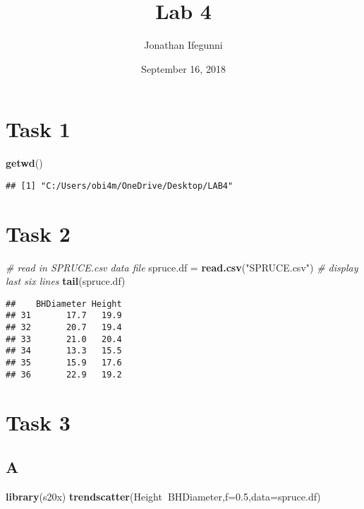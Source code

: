 \documentclass[]{article}
\title{Lab 4}
\author{Jonathan Ifegunni}
\date{September 16, 2018}
\newenvironment{Shaded}{\begin{snugshade}}{\end{snugshade}}
\newcommand{\KeywordTok}[1]{\textcolor[rgb]{0.13,0.29,0.53}{\textbf{#1}}}
\newcommand{\DataTypeTok}[1]{\textcolor[rgb]{0.13,0.29,0.53}{#1}}
\newcommand{\FloatTok}[1]{\textcolor[rgb]{0.00,0.00,0.81}{#1}}
\newcommand{\StringTok}[1]{\textcolor[rgb]{0.31,0.60,0.02}{#1}}
\newcommand{\CommentTok}[1]{\textcolor[rgb]{0.56,0.35,0.01}{\textit{#1}}}
\newcommand{\OperatorTok}[1]{\textcolor[rgb]{0.81,0.36,0.00}{\textbf{#1}}}
\newcommand{\NormalTok}[1]{#1}
\begin{document}
\maketitle

\section{Task 1}\label{task-1}

\begin{Shaded}
\begin{Highlighting}[]
\KeywordTok{getwd}\NormalTok{()}
\end{Highlighting}
\end{Shaded}

\begin{verbatim}
## [1] "C:/Users/obi4m/OneDrive/Desktop/LAB4"
\end{verbatim}

\section{Task 2}\label{task-2}

\begin{Shaded}
\begin{Highlighting}[]
\CommentTok{# read in SPRUCE.csv data file}
\NormalTok{spruce.df =}\StringTok{ }\KeywordTok{read.csv}\NormalTok{(}\StringTok{"SPRUCE.csv"}\NormalTok{)}
\CommentTok{# display last six lines}
\KeywordTok{tail}\NormalTok{(spruce.df)}
\end{Highlighting}
\end{Shaded}

\begin{verbatim}
##    BHDiameter Height
## 31       17.7   19.9
## 32       20.7   19.4
## 33       21.0   20.4
## 34       13.3   15.5
## 35       15.9   17.6
## 36       22.9   19.2
\end{verbatim}

\section{Task 3}\label{task-3}

\subsection{A}\label{a}

\begin{Shaded}
\begin{Highlighting}[]
\KeywordTok{library}\NormalTok{(s20x)}
\KeywordTok{trendscatter}\NormalTok{(Height}\OperatorTok{~}\NormalTok{BHDiameter,}\DataTypeTok{f=}\FloatTok{0.5}\NormalTok{,}\DataTypeTok{data=}\NormalTok{spruce.df)}
\end{Highlighting}
\end{Shaded}
\end{document}
